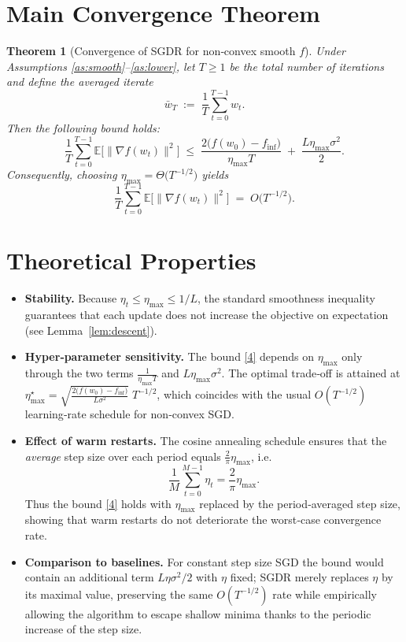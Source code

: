 \documentclass{article}
\newtheorem{theorem}{Theorem}
\begin{document}
\section*{Main Convergence Theorem}
\begin{theorem}[Convergence of SGDR for non‑convex smooth $f$]\label{thm:main}
Under Assumptions \ref{as:smooth}–\ref{as:lower}, let $T\ge 1$ be the total number of iterations and define the averaged iterate
\[
\bar w_T \;:=\; \frac{1}{T}\sum_{t=0}^{T-1} w_t .
\]
Then the following bound holds:
\[
\frac{1}{T}\sum_{t=0}^{T-1}\mathbb{E}\big[\|\nabla f(w_t)\|^2\big]
\;\le\;
\frac{2\big(f(w_0)-f_{\inf}\big)}{\eta_{\max} T}
\;+\;
\frac{L\eta_{\max}\sigma^2}{2}.
\tag{4}
\]
Consequently, choosing $\eta_{\max}= \Theta\!\big(T^{-1/2}\big)$ yields
\[
\frac{1}{T}\sum_{t=0}^{T-1}\mathbb{E}\big[\|\nabla f(w_t)\|^2\big]
\;=\; O\!\big(T^{-1/2}\big).
\]
\end{theorem}

\section*{Theoretical Properties}
\begin{itemize}[leftmargin=*]
\item \textbf{Stability.} Because $\eta_t\le\eta_{\max}\le 1/L$, the standard smoothness inequality guarantees that each update does not increase the objective on expectation (see Lemma~\ref{lem:descent}).
\item \textbf{Hyper‑parameter sensitivity.} The bound \eqref{4} depends on $\eta_{\max}$ only through the two terms $\frac{1}{\eta_{\max}T}$ and $L\eta_{\max}\sigma^2$. The optimal trade‑off is attained at $\eta_{\max}^\star=\sqrt{\frac{2\big(f(w_0)-f_{\inf}\big)}{L\sigma^2}}\;T^{-1/2}$, which coincides with the usual $O(T^{-1/2})$ learning‑rate schedule for non‑convex SGD.
\item \textbf{Effect of warm restarts.} The cosine annealing schedule ensures that the \emph{average} step size over each period equals $\frac{2}{\pi}\eta_{\max}$, i.e.
\[
\frac{1}{M}\sum_{t=0}^{M-1}\eta_t=\frac{2}{\pi}\eta_{\max}.
\]
Thus the bound \eqref{4} holds with $\eta_{\max}$ replaced by the period‑averaged step size, showing that warm restarts do not deteriorate the worst‑case convergence rate.
\item \textbf{Comparison to baselines.} For constant step size SGD the bound would contain an additional term $L\eta\sigma^2/2$ with $\eta$ fixed; SGDR merely replaces $\eta$ by its maximal value, preserving the same $O(T^{-1/2})$ rate while empirically allowing the algorithm to escape shallow minima thanks to the periodic increase of the step size.
\end{itemize}
\end{document}
